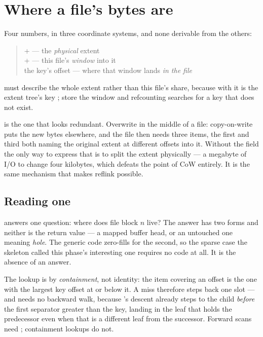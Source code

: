 \section{Where a file's bytes are}

Four numbers, in three coordinate systems, and none derivable from the others:

\begin{quote}
 +  --- the \emph{physical} extent\\
 +  --- this file's \emph{window} into it\\
the key's offset --- where that window lands \emph{in the file}
\end{quote}

 must describe the whole extent rather than this file's
share, because with  it is the extent tree's key
; store the window and refcounting
searches for a key that does not exist.

 is the one that looks redundant. Overwrite  in the middle
of a  file: copy-on-write puts the new bytes elsewhere, and the file then
needs three items, the first and third both naming the original extent at
different offsets into it. Without the field the only way to express that is to
split the extent physically --- a megabyte of I/O to change four kilobytes,
which defeats the point of CoW entirely. It is the same mechanism that makes
reflink possible.

\subsection{Reading one}

 answers one question: where does file block $n$
live? The answer has two forms and neither is the return value --- a mapped
buffer head, or an untouched one meaning \emph{hole}. The generic code
zero-fills for the second, so the sparse case the skeleton called this phase's
interesting one requires no code at all. It is the absence of an answer.

The lookup is by \emph{containment}, not identity: the item covering an offset
is the one with the largest key offset at or below it. A miss therefore steps
back one slot --- and needs no backward walk, because
's descent already steps to the child \emph{before} the
first separator greater than the key, landing in the leaf that holds the
predecessor even when that is a different leaf from the successor. Forward scans
need ; containment lookups do not.

